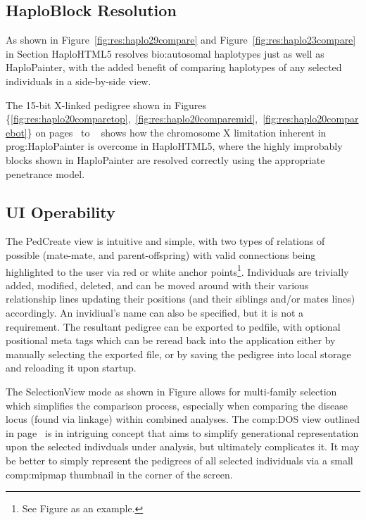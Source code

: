 \subsection{HaploBlock Resolution}
As shown in Figure~\ref{fig:res:haplo29compare} and Figure~\ref{fig:res:haplo23compare} in Section HaploHTML5 resolves \gls{bio:autosomal} haplotypes just as well as HaploPainter, with the added benefit of comparing haplotypes of any selected individuals in a side-by-side view.

The 15-bit X-linked pedigree shown in Figures \{\ref{fig:res:haplo20comparetop},~\ref{fig:res:haplo20comparemid},~\ref{fig:res:haplo20comparebot}\} on pages~\pageref*{fig:res:haplo20comparetop} to ~\pageref*{fig:res:haplo20comparebot} shows how the chromosome X limitation inherent in \gls{prog:HaploPainter} is overcome in HaploHTML5, where the highly improbably blocks shown in HaploPainter are resolved correctly using the appropriate penetrance model.

\subsection{UI Operability}
The PedCreate view is intuitive and simple, with two types of relations of possible (mate-mate, and parent-offspring) with valid connections being highlighted to the user via red or white anchor points\footnote{See Figure as an example.}. Individuals are trivially added, modified, deleted, and can be moved around with their various relationship lines updating their positions (and their siblings and/or mates lines) accordingly. An invidiual's name can also be specified, but it is not a requirement. The resultant pedigree can be exported to pedfile, with optional positional meta tags which can be reread back into the application either by manually selecting the exported file, or by saving the pedigree into local storage and reloading it upon startup.

The SelectionView mode as shown in Figure allows for multi-family selection which simplifies the comparison process, especially when comparing the disease locus (found via linkage) within combined analyses. The \gls{comp:DOS}\label{ref:disc:dos} view outlined in page~\pageref{ref:haplo:dos} is in intriguing concept that aims to simplify generational representation upon the selected indivduals under analysis, but ultimately complicates it. It may be better to simply represent the pedigrees of all selected individuals via a small \gls{comp:mipmap} thumbnail in the corner of the screen.

